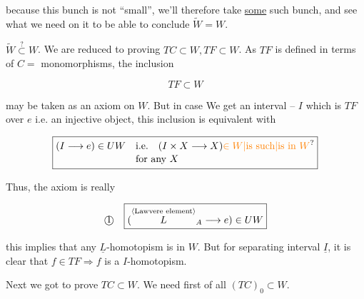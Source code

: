 

because this bunch is not ``small'', we'll therefore take \uline{some} such bunch, and see what we need on it to be able to conclude $\widetilde W=W$.

$\widetilde W\overset{?}{\subset}W$. We are reduced to proving $TC\subset W,TF\subset W$. As $TF$ is defined in terms of $C={}$ monomorphisms, the inclusion

\[\boxed{TF\subset W}\]

may be taken as an axiom on $W$. But in case We get an  interval -- $I$ which is $TF$ over $e$ i.e. an injective object,  this inclusion is equivalent with

\[\boxed{\begin{aligned}
(I\longrightarrow e)\in UW\quad&\text{i.e.}\quad(I\times X\longrightarrow X)\unsure{\in W|\text{is such}|\text{is in }W}\\[-2pt]
&\text{for any }X
\end{aligned}}\]


Thus, the axiom is really

\[
\text{\textcircled{1}}\quad\boxed{(\overset{\text{\inserted{Lawvere element}}}{L}_A\longrightarrow e)\in UW}
\]


this implies that any $\underline L$-homotopism is in $W$. But for  separating interval $\underline I$, it is clear that $f\in TF\Longrightarrow f$ is a $I$-homotopism.

Next we got to prove $TC\subset W$. We need first of all $(TC)_0\subset W$.


